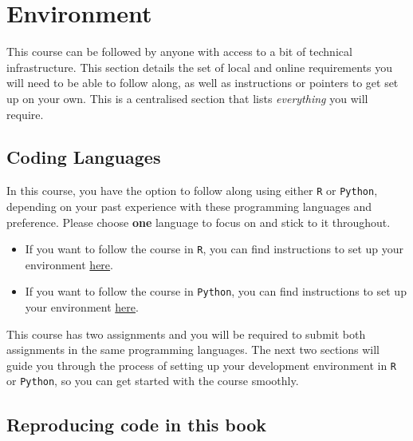 \documentclass[
  letterpaper,
  DIV=11,
  numbers=noendperiod]{scrreprt}
\begin{document}
\chapter*{Environment}\label{environment}


This course can be followed by anyone with access to a bit of technical
infrastructure. This section details the set of local and online
requirements you will need to be able to follow along, as well as
instructions or pointers to get set up on your own. This is a
centralised section that lists \emph{everything} you will require.

\section*{Coding Languages}\label{coding-languages}


In this course, you have the option to follow along using either
\texttt{R} or \texttt{Python}, depending on your past experience with
these programming languages and preference. Please choose \textbf{one}
language to focus on and stick to it throughout.

\begin{itemize}
\item
  If you want to follow the course in \texttt{R}, you can find
  instructions to set up your environment
  \href{https://pietrostefani.github.io/gds/environR.html}{here}.
\item
  If you want to follow the course in \texttt{Python}, you can find
  instructions to set up your environment
  \href{https://pietrostefani.github.io/gds/environPy.html}{here}.
\end{itemize}

This course has two assignments and you will be required to submit both
assignments in the same programming languages. The next two sections
will guide you through the process of setting up your development
environment in \texttt{R} or \texttt{Python}, so you can get started
with the course smoothly.

\section*{Reproducing code in this
book}\label{reproducing-code-in-this-book}
\end{document}
